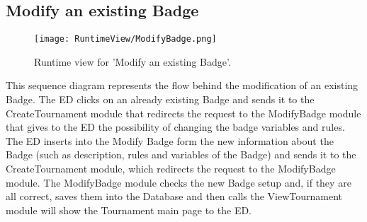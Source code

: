 \subsection{Modify an existing Badge}
\begin{figure}[H]
    \begin{center}
        \texttt{[image: RuntimeView/ModifyBadge.png]}
        \caption{Runtime view for 'Modify an existing Badge'.}
        \label{fig:runtime_modifybadge}%
    \end{center}
\end{figure}
This sequence diagram represents the flow behind the modification of an existing Badge. The ED clicks on an already existing Badge and sends it to the CreateTournament module that redirects the request to the ModifyBadge module that gives to the ED the possibility of changing the badge variables and rules. The ED inserts into the Modify Badge form the new information about the Badge (such as description, rules and variables of the Badge) and sends it to the CreateTournament module, which redirects the request to the ModifyBadge module. The ModifyBadge module checks the new Badge setup and, if they are all correct, saves them into the Database and then calls the ViewTournament module will show the Tournament main page to the ED.





